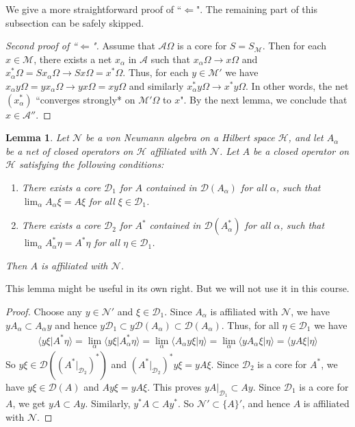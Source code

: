 \documentclass[12pt,b5paper,notitlepage]{article}
\theoremstyle{definition}
\theoremstyle{plain}
\newtheorem{lm}[df]{Lemma}
\newcommand{\mc}{\mathcal}
\newcommand{\Dom}{\scr{D}}
\newcommand{\bk}[1]{\langle {#1}\rangle}
\newcommand{\scr}{\mathscr}
\numberwithin{equation}{section}
\begin{document}
We give a more straightforward proof of ``$\Leftarrow$". The remaining part of this subsection can be safely skipped.

\begin{proof}[Second proof of ``$\Leftarrow$"]
Assume that $\mc A\Omega$ is a core for $S=S_{\mc M}$. Then for each $x\in\mc M$, there exists a net $x_\alpha$ in $\mc A$ such that $x_\alpha\Omega\rightarrow x\Omega$ and $x_\alpha^*\Omega=Sx_\alpha\Omega\rightarrow Sx\Omega=x^*\Omega$. Thus, for each $y\in\mc M'$ we have $x_\alpha y\Omega=yx_\alpha\Omega\rightarrow yx\Omega=xy\Omega$ and similarly $x_\alpha^*y\Omega\rightarrow x^*y\Omega$. In other words, the net $(x_\alpha^*)$ ``converges strongly* on $\mc M'\Omega$ to $x$". By the next lemma, we conclude that $x\in\mc A''$.
\end{proof}


\begin{lm}
Let $\mc N$ be a von Neumann algebra on a Hilbert space $\mc H$, and let $A_\alpha$ be a net of closed operators on $\mc H$ affiliated with $\mc N$. Let $A$ be a closed operator on $\mc H$ satisfying the following conditions:
\begin{enumerate}[label=(\alph*)]
\item There exists a core $\Dom_1$ for $A$ contained in $\Dom(A_\alpha)$ for all $\alpha$, such that $\lim_\alpha A_\alpha\xi=A\xi$ for all $\xi\in\Dom_1$.
\item There exists a core $\Dom_2$ for $A^*$ contained in $\Dom(A_\alpha^*)$ for all $\alpha$, such that $\lim_\alpha A_\alpha^*\eta=A^*\eta$ for all $\eta\in\Dom_1$.
\end{enumerate}
Then $A$ is affiliated with $\mc N$.
\end{lm}

This lemma might be useful in its own right. But we will not use it in this course.

\begin{proof}
Choose any $y\in\mc N'$ and $\xi\in\Dom_1$. Since $A_\alpha$ is affiliated with $\mc N$, we have $yA_\alpha\subset A_\alpha y$ and hence $y\Dom_1\subset y\Dom(A_\alpha)\subset \Dom(A_\alpha)$. Thus, for all $\eta\in\Dom_1$ we have
\begin{align*}
\bk{y\xi|A^*\eta}=\lim_\alpha \bk{y\xi|A_\alpha^*\eta}=\lim_\alpha \bk{A_\alpha y\xi|\eta}=\lim_\alpha \bk{yA_\alpha\xi|\eta}=\bk{yA\xi|\eta}
\end{align*}
So $y\xi\in\Dom((A^*|_{\Dom_2})^*)$ and $(A^*|_{\Dom_2})^*y\xi=yA\xi$. Since $\Dom_2$ is a core for $A^*$, we have $y\xi\in\Dom(A)$ and $Ay\xi=yA\xi$. This proves $yA|_{\Dom_1}\subset Ay$. Since $\Dom_1$ is a core for $A$, we get $yA\subset Ay$. Similarly, $y^*A\subset Ay^*$. So $\mc N'\subset\{A\}'$, and hence $A$ is affiliated with $\mc N$.
\end{proof}
\end{document}
